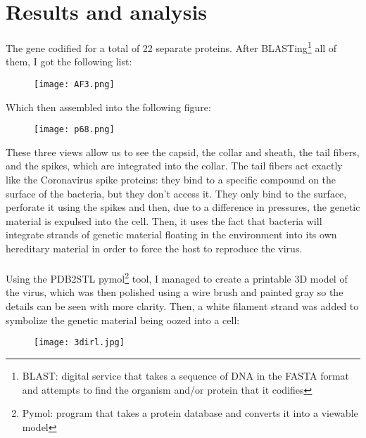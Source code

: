\section{Results and analysis}
The gene codified for a total of 22 separate proteins. After BLASTing\footnote{BLAST: digital service that takes a sequence of DNA in the FASTA format and attempts to find the organism and/or protein that it codifies} all of them, I got the following list:
\begin{center}\begin{figure}[H]\centering\texttt{[image: AF3.png]}\end{figure}\end{center}
Which then assembled into the following figure:
\begin{center}\begin{figure}[H]\centering\texttt{[image: p68.png]}\end{figure}\end{center}
These three views allow us to see the capsid, the collar and sheath, the tail fibers, and the spikes, which are integrated into the collar. The tail fibers act exactly like the Coronavirus spike proteins: they bind to a specific compound on the surface of the bacteria, but they don't access it. They only bind to the surface, perforate it using the spikes and then, due to a difference in pressures, the genetic material is expulsed into the cell. Then, it uses the fact that bacteria will integrate strands of genetic material floating in the environment into its own hereditary material in order to force the host to reproduce the virus.
\paragraph{}Using the PDB2STL pymol\footnote{Pymol: program that takes a protein database and converts it into a viewable model} tool, I managed to create a printable 3D model of the virus, which was then polished using a wire brush and painted gray so the details can be seen with more clarity. Then, a white filament strand was added to symbolize the genetic material being oozed into a cell:
\begin{center}\begin{figure}[H]\centering\texttt{[image: 3dirl.jpg]}\end{figure}\end{center}
